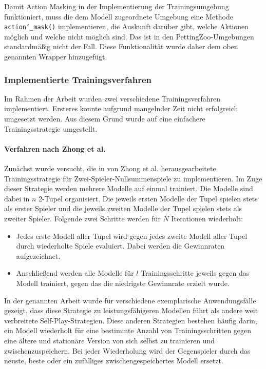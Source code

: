 \endgroup

Damit Action Masking in der Implementierung der Trainingsumgebung funktioniert, muss die dem Modell zugeordnete Umgebung eine Methode \texttt{action\char`_mask()} implementieren, die Auskunft darüber gibt, welche Aktionen möglich und welche nicht möglich sind. Das ist in den PettingZoo-Umgebungen standardmäßig nicht der Fall. Diese Funktionalität wurde daher dem oben genannten Wrapper hinzugefügt.

\subsubsection{Implementierte Trainingsverfahren}

Im Rahmen der Arbeit wurden zwei verschiedene Trainingsverfahren implementiert. Ersteres konnte aufgrund mangelnder Zeit nicht erfolgreich umgesetzt werden. Aus diesem Grund wurde auf eine einfachere Trainingsstrategie umgestellt.

\paragraph{Verfahren nach Zhong et al.}

Zunächst wurde versucht, die in \cite{Zhong.2020} von Zhong et al. herausgearbeitete Trainingsstrategie für Zwei-Spieler-Nullsummenspiele zu implementieren. Im Zuge dieser Strategie werden mehrere Modelle auf einmal trainiert. Die Modelle sind dabei in $n$ 2-Tupel organisiert. Die jeweils ersten Modelle der Tupel spielen stets als erster Spieler und die jeweils zweiten Modelle der Tupel spielen stets als zweiter Spieler. Folgende zwei Schritte werden für $N$ Iterationen wiederholt:

\begin{itemize}
	\item Jedes erste Modell aller Tupel wird gegen jedes zweite Modell aller Tupel durch wiederholte Spiele evaluiert. Dabei werden die Gewinnraten aufgezeichnet.
	\item Anschließend werden alle Modelle für $l$ Trainingsschritte jeweils gegen das Modell trainiert, gegen das die niedrigste Gewinnrate erzielt wurde.
\end{itemize}

In der genannten Arbeit wurde für verschiedene exemplarische Anwendungsfälle gezeigt, dass diese Strategie zu leistungsfähigeren Modellen führt als andere weit verbreitete Self-Play-Strategien. Diese anderen Strategien bestehen häufig darin, ein Modell wiederholt für eine bestimmte Anzahl von Trainingsschritten gegen eine ältere und stationäre Version von sich selbst zu trainieren und zwischenzuspeichern. Bei jeder Wiederholung wird der Gegenspieler durch das neuste, beste oder ein zufälliges zwischengespeichertes Modell ersetzt.

